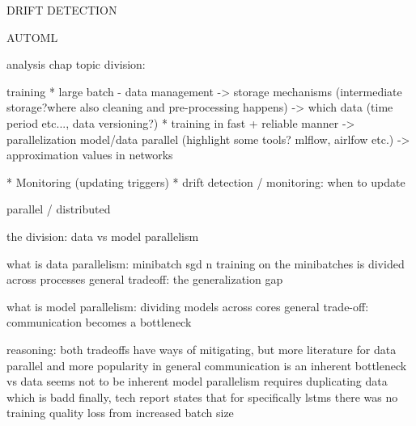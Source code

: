 DRIFT DETECTION


AUTOML




analysis chap topic division: 

training
* large batch - data management
    -> storage mechanisms (intermediate storage?where also cleaning and pre-processing happens)
    -> which data (time period etc..., data versioning?)
* training in fast + reliable manner
	-> parallelization model/data parallel (highlight some tools? mlflow, airlfow etc.)
	-> approximation values in networks

* Monitoring (updating triggers)
* drift detection / monitoring: when to update


parallel / distributed

the division: data vs model parallelism

what is data parallelism: minibatch sgd n training on the minibatches is divided across processes
general tradeoff: the generalization gap

what is model parallelism: dividing models across cores
general trade-off: communication becomes a bottleneck

reasoning:
both tradeoffs have ways of mitigating, but more literature for data parallel and more popularity in general
communication is an inherent bottleneck vs data seems not to be inherent
model parallelism requires duplicating data which is badd
finally, tech report states that for specifically lstms there was no training quality loss from increased batch size